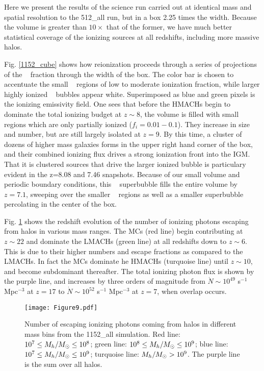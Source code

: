 \documentclass[iop,apj]{emulateapj}
\begin{document}
Here we present the results of the science run carried out at identical mass and spatial resolution to the 512\_all run, but in a box 2.25 times the width. Because the volume is greater than $10 \times$ that of the former, we have much better statistical coverage of the ionizing sources at all redshifts, including more massive halos. 

Fig. \ref{1152_cube} shows how reionization proceeds through a series of projections of the \hi~ fraction through the width of the box. The color bar is chosen to accentuate the small \hii~ regions of low to moderate ionization fraction, while larger highly ionized \hii~ bubbles appear white. Superimposed as blue and green pixels is the ionizing emissivity field. One sees that before the HMACHs begin to dominate the total ionizing budget at $z \sim 8$, the volume is filled with small \hii~ regions which are only partially ionized ($f_i=0.01-0.1$). They increase in size and number, but are still largely isolated at $z=9$. By this time, a cluster of dozens of higher mass galaxies forms in the upper right hand corner of the box, and their combined ionizing flux drives a strong ionization front into the IGM. That it is clustered sources that drive the larger ionized bubble is particulary evident in the z=8.08 and 7.46 snapshots. Because of our small volume and periodic boundary conditions, this \hii~ superbubble fills the entire volume by $z=7.1$, sweeping over the smaller \hii~ regions as well as a smaller superbubble percolating in the center of the box. 

Fig. \ref{Ndot} shows the redshift evolution of the number of ionizing photons escaping from halos in various mass ranges. The MCs (red line) begin contributing at $z \sim 22$ and dominate the LMACHs (green line) at all redshifts down to $z \sim 6$. This is due to their higher numbers and escape fractions as compared to the LMACHs. In fact the MCs dominate he HMACHs (turquoise line) until $z \sim 10$, and become subdominant thereafter. The total ionizing photon flux is shown by the purple line, and increases by three orders of magnitude from $\dot{N} \sim 10^{49}$ s$^{-1}$ Mpc$^{-3}$ at $z=17$ to $\dot{N} \sim 10^{52}$ s$^{-1}$ Mpc$^{-3}$ at $z=7$, when overlap occurs. 

\begin{figure}
\texttt{[image: Figure9.pdf]}
\caption{Number of escaping ionizing photons coming from halos in different mass bins from the 1152\_all simulation. Red line: $10^7 \leq M_h/M_{\odot} \leq  10^8$; green line: $10^8 \leq M_h/M_{\odot}  \leq 10^9$; blue line: $10^7 \leq M_h/M_{\odot}  \leq 10^9$; turquoise line: $M_h/M_{\odot} > 10^9$. The purple line is the sum over all halos.}
\label{Ndot}
\end{figure}
\end{document}
